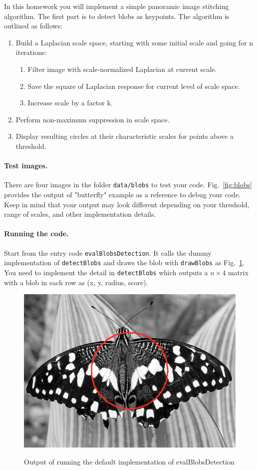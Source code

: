 \documentclass[10pt,letterpaper]{article}
\newcommand{\cmd}[1] {{\color{blue}\texttt{#1}}}
\begin{document}
In this homework you will implement a simple panoramic image stitching algorithm. The first part is to detect blobs as keypoints. The algorithm is outlined as follows:

\begin{enumerate}
\item Build a Laplacian scale space, starting with some initial scale and going for n iterations:
\begin{enumerate}
\item Filter image with scale-normalized Laplacian at current scale.
\item Save the square of Laplacian response for current level of scale space.
\item Increase scale by a factor k.
\end{enumerate}
\item Perform non-maximum suppression in scale space.
\item Display resulting circles at their characteristic scales for points above a threshold.
\end{enumerate}

\paragraph{Test images.} There are four images in the folder \cmd{data/blobs} to test your code. Fig.~\ref{fig:blobs} provides the output of "butterfly" example as a reference to debug your code. Keep in mind that your output may look different depending on your threshold, range of scales, and other implementation details.

\paragraph{Running the code.} Start from the entry code \cmd{evalBlobsDetection}. It calls the dummy implementation of \cmd{detectBlobs} and draws the blob with \cmd{drawBlobs} as Fig.~\ref{fig:dummy}. You need to implement the detail in \cmd{detectBlobs} which outputs a $n \times 4$ matrix with a blob in each row as (x, y, radius, score). 

\begin{figure}[h]
\centering
\includegraphics[width=0.3\linewidth]{./fig/butterfly-dummy.png} 
\label{fig:dummy}
\caption{\label{fig:dummy} Output of running the default implementation of evalBlobsDetection}
\end{figure}
\end{document}
